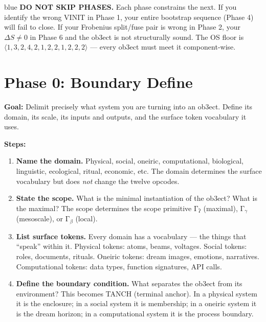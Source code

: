 \documentclass[12pt,a4paper]{article}
\begin{document}
\begin{admonitionbox}{blue}
{\bf DO NOT SKIP PHASES.} Each phase constrains the next. If you identify the wrong
VINIT in Phase 1, your entire bootstrap sequence (Phase 4) will fail to close. If your
Frobenius split/fuse pair is wrong in Phase 2, your $\Delta S \neq 0$ in Phase 6 and
the ob3ect is not structurally sound. The OS floor is $\langle 1,3,2,4,2,1,2,2,1,2,2,2
\rangle$ — every ob3ect must meet it component-wise.
\end{admonitionbox}

\section{Phase 0: Boundary Define}

{\bf Goal:} Delimit precisely what system you are turning into an ob3ect. Define its
domain, its scale, its inputs and outputs, and the surface token vocabulary it uses.

{\bf Steps:}

\begin{enumerate}[label=\textbf{0.\arabic*.}, leftmargin=2em]
\item \textbf{Name the domain.} Physical, social, oneiric, computational, biological,
    linguistic, ecological, ritual, economic, etc. The domain determines the surface
    vocabulary but does \emph{not} change the twelve opcodes.

\item \textbf{State the scope.} What is the minimal instantiation of the ob3ect? What
    is the maximal? The scope determines the scope primitive $\text{Γ}_{\text{ʔ}}$
    (maximal), $\text{Γ}_{\gamma}$ (mesoscale), or $\text{Γ}_{\beta}$ (local).

\item \textbf{List surface tokens.} Every domain has a vocabulary — the things that
    ``speak'' within it. Physical tokens: atoms, beams, voltages. Social tokens: roles,
    documents, rituals. Oneiric tokens: dream images, emotions, narratives.
    Computational tokens: data types, function signatures, API calls.

\item \textbf{Define the boundary condition.} What separates the ob3ect from its
    environment? This becomes TANCH (terminal anchor). In a physical system it is the
    enclosure; in a social system it is membership; in a oneiric system it is the dream
    horizon; in a computational system it is the process boundary.
\end{enumerate}
\end{document}
